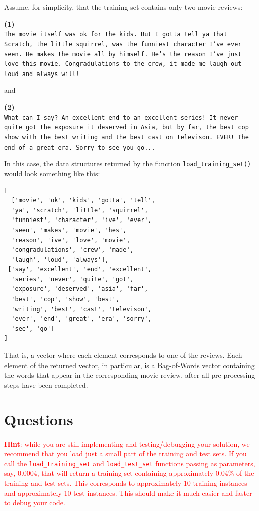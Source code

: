 \documentclass[letterpaper]{article}
\begin{document}
Assume, for simplicity, that the training set contains only two movie reviews:

\noindent \textbf{(1)} \\
\noindent \texttt{The movie itself was ok for the kids. But I gotta tell ya that Scratch, the little squirrel, was the funniest character I've ever seen. He makes the movie all by himself. He's the reason I've just love this movie. Congradulations to the crew, it made me laugh out loud and always will!}

\noindent and

\noindent \textbf{(2)} \\
\noindent \texttt{What can I say? An excellent end to an excellent series! It never quite got the exposure it deserved in Asia, but by far, the best cop show with the best writing and the best cast on televison. EVER! The end of a great era. Sorry to see you go...}

In this case, the data structures returned by the function \texttt{load\_training\_set()} would look something like this:

\noindent \begin{verbatim}
[
  ['movie', 'ok', 'kids', 'gotta', 'tell',
  'ya', 'scratch', 'little', 'squirrel',
  'funniest', 'character', 'ive', 'ever',
  'seen', 'makes', 'movie', 'hes',
  'reason', 'ive', 'love', 'movie',
  'congradulations', 'crew', 'made',
  'laugh', 'loud', 'always'],
 ['say', 'excellent', 'end', 'excellent',
  'series', 'never', 'quite', 'got',
  'exposure', 'deserved', 'asia', 'far',
  'best', 'cop', 'show', 'best',
  'writing', 'best', 'cast', 'televison',
  'ever', 'end', 'great', 'era', 'sorry',
  'see', 'go']
]
\end{verbatim}

\noindent That is, a vector where each element corresponds to one of the reviews. Each element of the returned vector, in particular, is a Bag-of-Words vector containing the words that appear in the corresponding movie review, after all pre-processing steps have been completed.




\section{Questions}

\textcolor{red}{\textbf{Hint}: while you are still implementing and testing/debugging your solution, we recommend that you load just a small part of the training and test sets. If you call the \texttt{load\_training\_set} and \texttt{load\_test\_set} functions passing as parameters, say, 0.0004, that will return a training set containing approximately 0.04\% of the training and test sets. This corresponds to approximately 10 training instances and approximately 10 test instances. This should make it much easier and faster to debug your code.}
\end{document}
